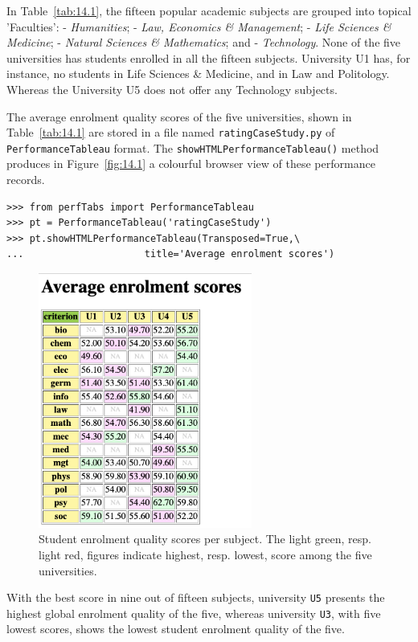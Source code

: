 In Table~\vref{tab:14.1}, the fifteen popular academic subjects are grouped into topical 'Faculties': - \emph{Humanities}; - \emph{Law, Economics \& Management}; - \emph{Life Sciences \& Medicine}; - \emph{Natural Sciences \& Mathematics}; and - \emph{Technology}. None of the five universities has students enrolled in all the fifteen subjects. University U1 has, for instance, no students in Life Sciences \& Medicine, and in Law and Politology. Whereas the University U5 does not offer any Technology subjects.

The average enrolment quality scores of the five universities, shown in Table~\vref{tab:14.1} are stored in a file named \texttt{ratingCaseStudy.py} of \texttt{PerformanceTableau} format. The \texttt{showHTMLPerformanceTableau()}  method produces in Figure~\vref{fig:14.1} a colourful browser view of these performance records. 
\begin{lstlisting}
>>> from perfTabs import PerformanceTableau
>>> pt = PerformanceTableau('ratingCaseStudy')
>>> pt.showHTMLPerformanceTableau(Transposed=True,\
...                     title='Average enrolment scores')
\end{lstlisting}
\begin{figure}[ht]
\sidecaption[t]
\includegraphics[width=7cm]{Figures/14-1-enrolmentScores.png}
\caption[Student enrolment quality scores per subject]{Student enrolment quality scores per subject. The light green, resp. light red, figures indicate highest, resp. lowest, score among the five universities.}
\label{fig:14.1}       %
\end{figure}

With the best score in nine out of fifteen subjects, university \texttt{U5} presents the highest global enrolment quality of the five, whereas university \texttt{U3}, with five lowest scores, shows the lowest student enrolment quality of the five.

